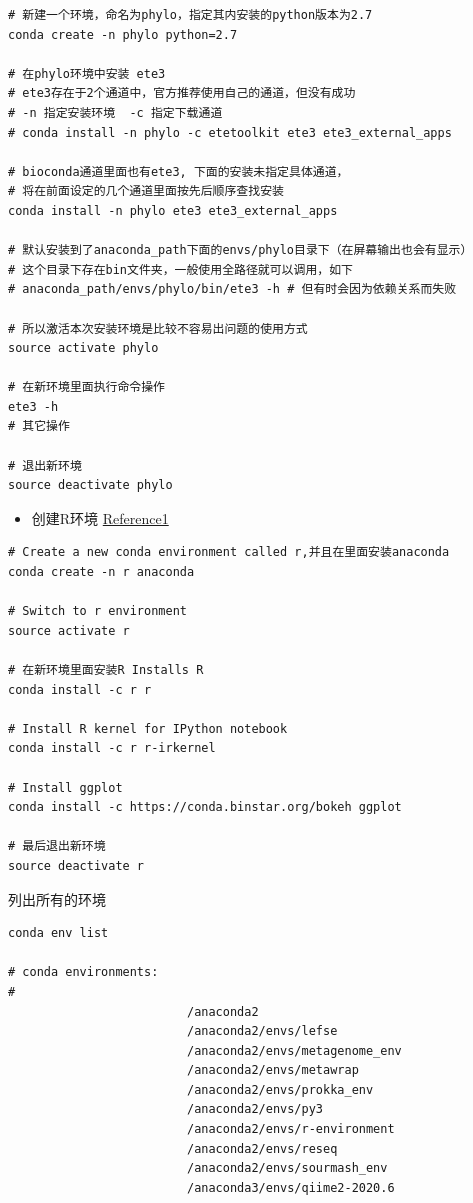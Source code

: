 \documentclass[]{article}
\providecommand{\tightlist}{%
  \setlength{\itemsep}{0pt}\setlength{\parskip}{0pt}}
\numberwithin{figure}{section}
\numberwithin{table}{section}
\begin{document}
\begin{verbatim}
# 新建一个环境，命名为phylo，指定其内安装的python版本为2.7
conda create -n phylo python=2.7

# 在phylo环境中安装 ete3 
# ete3存在于2个通道中，官方推荐使用自己的通道，但没有成功
# -n 指定安装环境  -c 指定下载通道
# conda install -n phylo -c etetoolkit ete3 ete3_external_apps

# bioconda通道里面也有ete3, 下面的安装未指定具体通道，
# 将在前面设定的几个通道里面按先后顺序查找安装
conda install -n phylo ete3 ete3_external_apps

# 默认安装到了anaconda_path下面的envs/phylo目录下（在屏幕输出也会有显示）
# 这个目录下存在bin文件夹，一般使用全路径就可以调用，如下
# anaconda_path/envs/phylo/bin/ete3 -h # 但有时会因为依赖关系而失败

# 所以激活本次安装环境是比较不容易出问题的使用方式
source activate phylo

# 在新环境里面执行命令操作
ete3 -h
# 其它操作

# 退出新环境
source deactivate phylo
\end{verbatim}

\begin{itemize}
\tightlist
\item
  创建R环境 \href{https://samrelton.wordpress.com/2015/07/02/rconda/}{Reference1}
\end{itemize}

\begin{verbatim}
# Create a new conda environment called r,并且在里面安装anaconda
conda create -n r anaconda

# Switch to r environment
source activate r

# 在新环境里面安装R Installs R
conda install -c r r

# Install R kernel for IPython notebook
conda install -c r r-irkernel

# Install ggplot
conda install -c https://conda.binstar.org/bokeh ggplot

# 最后退出新环境
source deactivate r
\end{verbatim}

列出所有的环境

\begin{verbatim}
conda env list

# conda environments:
#
                         /anaconda2
                         /anaconda2/envs/lefse
                         /anaconda2/envs/metagenome_env
                         /anaconda2/envs/metawrap
                         /anaconda2/envs/prokka_env
                         /anaconda2/envs/py3
                         /anaconda2/envs/r-environment
                         /anaconda2/envs/reseq
                         /anaconda2/envs/sourmash_env
                         /anaconda3/envs/qiime2-2020.6
\end{verbatim}
\end{document}
